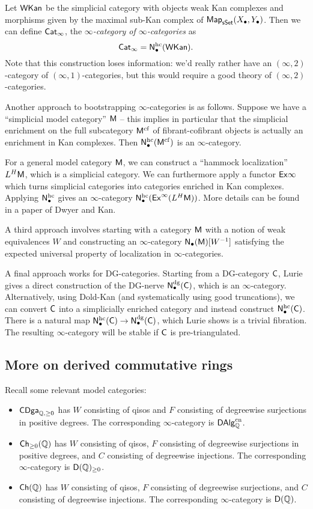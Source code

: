 \documentclass{amsart}
\begin{document}
Let $\mathsf{WKan}$ be the simplicial category with objects weak Kan complexes and morphisms given by the maximal sub-Kan complex of $\mathsf{Map}_{\mathsf{sSet}}(X_\bullet, Y_\bullet)$.
Then we can define $\mathsf{Cat}_\infty$, the \emph{$\infty$-category of $\infty$-categories} as
\[
	\mathsf{Cat}_\infty = \mathsf{N}_\bullet^{\mathrm{hc}}(\mathsf{WKan}).
\]
Note that this construction loses information: we'd really rather have an $(\infty, 2)$-category of $(\infty, 1)$-categories, but this would require a good theory of $(\infty, 2)$-categories.

Another approach to bootstrapping $\infty$-categories is as follows.
Suppose we have a ``simplicial model category'' $\mathsf{M}$ -- this implies in particular that the simplicial enrichment on the full subcategory $\mathsf{M}^{\mathrm{cf}}$ of fibrant-cofibrant objects is actually an enrichment in Kan complexes.
Then $\mathsf{N}_\bullet^{\mathrm{hc}}(\mathsf{M}^{\mathrm{cf}})$ is an $\infty$-category.

For a general model category $\mathsf{M}$, we can construct a ``hammock localization'' $L^H \mathsf{M}$, which is a simplicial category.
We can furthermore apply a functor $\mathsf{Ex}\infty$ which turns simplicial categories into categories enriched in Kan complexes.
Applying $\mathsf{N}_\bullet^{\mathrm{hc}}$ gives an $\infty$-category $\mathsf{N}_\bullet^{\mathrm{hc}}(\mathsf{Ex}^\infty(L^H \mathsf{M}))$.
More details can be found in a paper of Dwyer and Kan.

A third approach involves starting with a category $\mathsf{M}$ with a notion of weak equivalences $W$ and constructing an $\infty$-category $\mathsf{N}_\bullet(\mathsf{M})[W^{-1}]$ satisfying the expected universal property of localization in $\infty$-categories.

A final approach works for DG-categories.
Starting from a DG-category $\mathsf{C}$, Lurie gives a direct construction of the DG-nerve $\mathsf{N}_\bullet^{\mathrm{dg}}(\mathsf{C})$, which is an $\infty$-category.
Alternatively, using Dold-Kan (and systematically using good truncations), we can convert $\mathsf{C}$ into a simplicially enriched category and instead construct $\mathsf{N}_\bullet^{\mathrm{hc}}(\mathsf{C})$.
There is a natural map $\mathsf{N}_\bullet^{\mathrm{hc}}(\mathsf{C}) \to \mathsf{N}_\bullet^{\mathrm{dg}}(\mathsf{C})$, which Lurie shows is a trivial fibration.
The resulting $\infty$-category will be stable if $\mathsf{C}$ is pre-triangulated.

\subsection{More on derived commutative rings}

Recall some relevant model categories:
\begin{itemize}
	\item $\mathsf{CDga}_{\mathbb{Q},\geq 0}$ has $W$ consisting of qisos and $F$ consisting of degreewise surjections in positive degrees. 
		The corresponding $\infty$-category is $\mathsf{DAlg}_{\mathbb{Q}}^{\mathrm{cn}}$.
	\item $\mathsf{Ch}_{\geq 0}(\mathbb{Q})$ has $W$ consisting of qisos, $F$ consisting of degreewise surjections in positive degrees, and $C$ consisting of degreewise injections.
		The corresponding $\infty$-category is $\mathsf{D}(\mathbb{Q})_{\geq 0}$.
	\item $\mathsf{Ch}(\mathbb{Q})$ has $W$ consisting of qisos, $F$ consisting of degreewise surjections, and $C$ consisting of degreewise injections.
		The corresponding $\infty$-category is $\mathsf{D}(\mathbb{Q})$.
\end{itemize}
\end{document}
